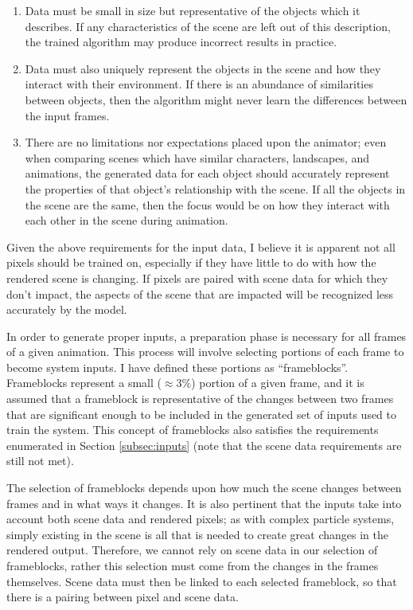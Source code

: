 \documentclass[conference]{IEEEtran}
\begin{document}
\begin{enumerate}
\item Data must be small in size but representative of the objects which it
describes. If any characteristics of the scene are left out of this
description, the trained algorithm may produce incorrect results in practice.
\item Data must also uniquely represent the objects in the scene and how they
interact with their environment.
If there is an abundance of similarities between objects, then
the algorithm might never learn the differences between the input frames.
\item There are no limitations nor expectations placed upon the animator;
even when comparing scenes which have similar characters, landscapes, and
animations, the generated data for each object should accurately represent
the properties of that object's relationship with the scene. If all the objects in the scene are the
same, then the focus would be on how they interact with each other in the scene
during animation.
\end{enumerate}

Given the above requirements for the input data,
I believe it is apparent not all pixels should be trained on, especially if they have
little to do with how the rendered scene is changing.
If pixels are paired with scene data for which they don't impact, the aspects of
the scene that are impacted will be recognized less accurately by the model.

In order to generate proper inputs,
a preparation phase is necessary for all frames of a given
animation. This process will involve selecting portions of each frame
to become system inputs.
I have defined these portions as ``frameblocks''.
Frameblocks represent a small ($\approx 3\%$) portion of a given frame,
and it is assumed
that a frameblock is representative of the changes between
two frames that are significant enough to
be included in the generated set of inputs used to train the system.
This concept of frameblocks also satisfies the
requirements enumerated in Section \ref{subsec:inputs} (note that the scene data
requirements are still not met).

The selection of frameblocks depends upon how much the scene changes
between frames and in what ways it changes.
It is also pertinent that the inputs
take into account both scene data and rendered pixels;
as with complex particle systems, simply existing in the scene is all that is
needed to create great changes in the rendered output.
Therefore, we cannot rely on scene data in our selection of frameblocks, rather
this selection must come from the changes in the frames themselves.
Scene data must then be linked to each selected frameblock, so that there is a
pairing between pixel and scene data.
\end{document}
